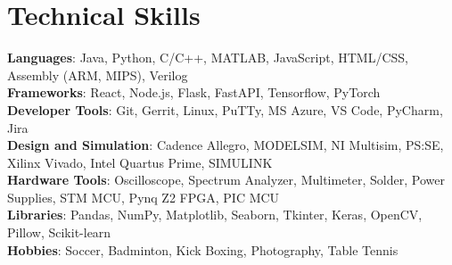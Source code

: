\documentclass[A4,10pt]{article}
\begin{document}
\section{Technical Skills}
\begin{itemize}[leftmargin=0.15in, label={}]
   \small{\item{
    \textbf{Languages}{: Java, Python, C/C++, MATLAB, JavaScript, HTML/CSS, Assembly (ARM, MIPS), Verilog} \\
    \textbf{Frameworks}{: React, Node.js, Flask, FastAPI, Tensorflow, PyTorch} \\
    \textbf{Developer Tools}{: Git, Gerrit, Linux, PuTTy, MS Azure, VS Code, PyCharm, Jira} \\
    \textbf{Design and Simulation}{: Cadence Allegro, MODELSIM, NI Multisim, PS:SE, Xilinx Vivado, Intel Quartus Prime, SIMULINK}\\
    \textbf{Hardware Tools}{: Oscilloscope, Spectrum Analyzer, Multimeter, Solder, Power Supplies, STM MCU, Pynq Z2 FPGA, PIC MCU}\\
    \textbf{Libraries}{: Pandas, NumPy, Matplotlib, Seaborn, Tkinter, Keras, OpenCV, Pillow, Scikit-learn}\\
    \textbf{Hobbies}{: Soccer, Badminton, Kick Boxing, Photography, Table Tennis}\\
   }}
\end{itemize}


  


  

\end{document}
